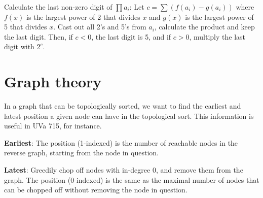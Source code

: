\documentclass[a4paper,11pt]{article}
\begin{document}
Calculate the last non-zero digit of $\prod a_i$: Let $c=\sum (f(a_i)-g(a_i))$ where $f(x)$ is the largest power of 2 that divides $x$ and $g(x)$ is the largest power of 5 that divides $x$. Cast out all 2's and 5's from $a_i$, calculate the product and keep the last digit. Then, if $c<0$, the last digit is 5, and if $c>0$, multiply the last digit with $2^c$.

\section{Graph theory}

In a graph that can be topologically sorted, we want to find the earliest and latest position a given node can have in the topological sort. This information is useful in UVa 715, for instance.

{\bf Earliest}: The position (1-indexed) is the number of reachable nodes in the reverse graph, starting from the node in question.

{\bf Latest}: Greedily chop off nodes with in-degree 0, and remove them from the graph. The position (0-indexed) is the same as the maximal number of nodes that can be chopped off without removing the node in question.
\end{document}

